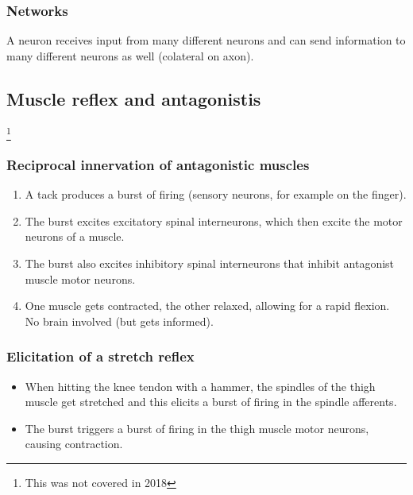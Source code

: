 \documentclass[main]{subfiles}
\begin{document}
\subsubsection{Networks}
A neuron receives input from many different neurons and can send information to many different neurons as well (colateral on axon).

\subsection{Muscle reflex and antagonistis}\footnote{This was not covered in 2018}
\subsubsection{Reciprocal innervation of antagonistic muscles}
\begin{enumerate}
	\item A tack produces a burst of firing (sensory neurons, for example on the finger).
	\item The burst excites excitatory spinal interneurons, which then excite the motor neurons of a muscle.
	\item The burst also excites inhibitory spinal interneurons that inhibit antagonist muscle motor neurons.
	\item One muscle gets contracted, the other relaxed, allowing for a rapid flexion. No brain involved (but gets informed).
\end{enumerate}
\subsubsection{Elicitation of a stretch reflex}
\begin{itemize}[noitemsep,nolistsep]
	\item When hitting the knee tendon with a hammer, the spindles of the thigh muscle get stretched and this elicits a burst of firing in the spindle afferents.
	\item The burst triggers a burst of firing in the thigh muscle motor neurons, causing contraction.
\end{itemize}
\end{document}
